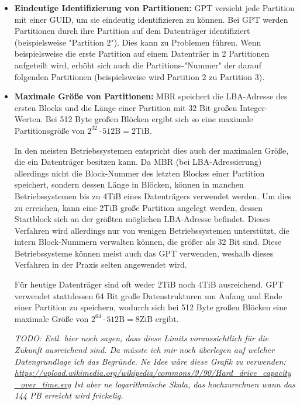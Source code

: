 \begin{itemize}
    \item \textbf{Eindeutige Identifizierung von Partitionen:} 
    GPT versieht jede Partition mit einer GUID, um sie eindeutig identifizieren zu können.
    Bei GPT werden Partitionen durch ihre Partition auf dem Datenträger identifiziert (beispielsweise "Partition 2").
    Dies kann zu Problemen führen. 
    Wenn beispielsweise die erste Partition auf einem Datenträer in 2 Partitionen aufgeteilt wird, erhöht sich auch die Partitions-"Nummer" der darauf folgenden Partitionen (beispielsweise wird Partition 2 zu Partition 3).

    \item \textbf{Maximale Größe von Partitionen:}
    MBR speichert die LBA-Adresse des ersten Blocks und die Länge einer Partition mit 32 Bit großen Integer-Werten.
    Bei 512 Byte großen Blöcken ergibt sich so eine maximale Partitionsgröße von $ 2^{32} \cdot 512 \mathrm{B} = 2 \mathrm{TiB} $.

    In den meisten Betriebssystemen entspricht dies auch der maximalen Größe, die ein Datenträger besitzen kann.
    Da MBR (bei LBA-Adressierung) allerdings nicht die Block-Nummer des letzten Blockes einer Partition speichert, sondern dessen Länge in Blöcken, können in manchen Betriebssystemen bis zu 4TiB eines Datenträgers verwendet werden. 
    Um dies zu erreichen, kann eine 2TiB große Partition angelegt werden, dessen Startblock sich an der größten möglichen LBA-Adresse befindet.
    Dieses Verfahren wird allerdings nur von wenigen Betriebssystemen unterstützt, die intern Block-Nummern verwalten können, die größer als 32 Bit sind.
    Diese Betriebssysteme können meist auch das GPT verwenden, weshalb dieses Verfahren in der Praxis selten angewendet wird.\cite{mbr-4tb-workaround}

    Für heutige Datenträger sind oft weder 2TiB noch 4TiB ausreichend.
    GPT verwendet stattdessen 64 Bit große Datenstrukturen um Anfang und Ende einer Partition zu speichern, wodurch sich bei 512 Byte großen Blöcken eine maximale Größe von $ 2^{64} \cdot 512 \mathrm{B} = 8 \mathrm{ZiB} $ ergibt.

    \small
    \textit{
    TODO: Evtl. hier noch sagen, dass diese Limits voraussichtlich für die Zukunft ausreichend sind.
    Da müsste ich mir noch überlegen auf welcher Datengrundlage ich das Begründe.
    Ne Idee wäre diese Grafik zu verwenden: \url{https://upload.wikimedia.org/wikipedia/commons/9/90/Hard_drive_capacity_over_time.svg}
    Ist aber ne logarithmische Skala, das hochzurechnen wann das 144 PB erreicht wird frickelig.
    }


\end{itemize}

